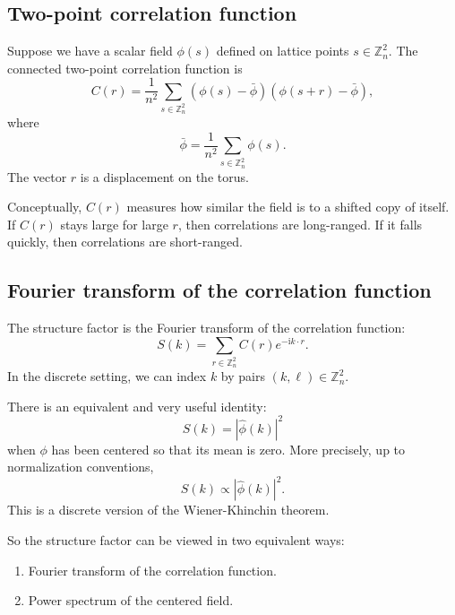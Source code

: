 \documentclass[11pt]{article}
\newcommand{\Zn}{\mathbb{Z}_n}
\newcommand{\ii}{\mathrm{i}}
\begin{document}
\subsection{Two-point correlation function}

Suppose we have a scalar field $\phi(s)$ defined on lattice points $s \in \Zn^2$. The connected two-point correlation function is
\begin{equation}
    C(r) = \frac{1}{n^2}\sum_{s \in \Zn^2} \left(\phi(s)-\bar{\phi}\right)\left(\phi(s+r)-\bar{\phi}\right),
\end{equation}
where
\begin{equation}
    \bar{\phi} = \frac{1}{n^2}\sum_{s \in \Zn^2} \phi(s).
\end{equation}
The vector $r$ is a displacement on the torus.

Conceptually, $C(r)$ measures how similar the field is to a shifted copy of itself. If $C(r)$ stays large for large $r$, then correlations are long-ranged. If it falls quickly, then correlations are short-ranged.

\subsection{Fourier transform of the correlation function}

The structure factor is the Fourier transform of the correlation function:
\begin{equation}
    S(k) = \sum_{r \in \Zn^2} C(r)e^{-\ii k \cdot r}.
\end{equation}
In the discrete setting, we can index $k$ by pairs $(k,\ell) \in \Zn^2$.

There is an equivalent and very useful identity:
\begin{equation}
    S(k) = \left|\widehat{\phi}(k)\right|^2
\end{equation}
when $\phi$ has been centered so that its mean is zero. More precisely, up to normalization conventions,
\begin{equation}
    S(k) \propto \left|\widehat{\phi}(k)\right|^2.
\end{equation}
This is a discrete version of the Wiener-Khinchin theorem.

So the structure factor can be viewed in two equivalent ways:
\begin{enumerate}
    \item Fourier transform of the correlation function.
    \item Power spectrum of the centered field.
\end{enumerate}
\end{document}
